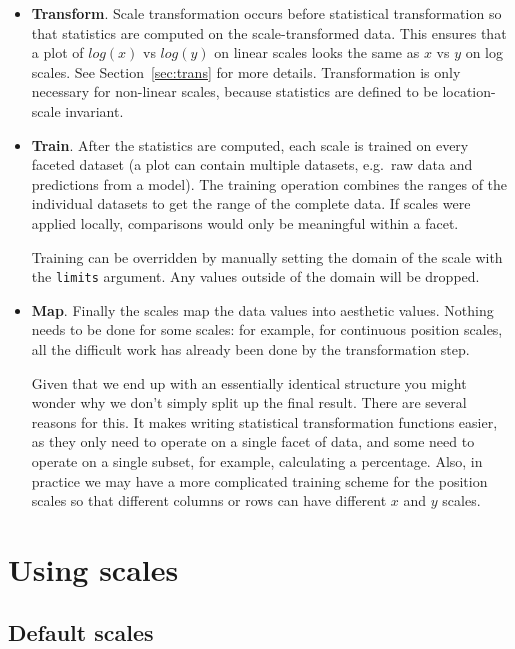 \begin{itemize}
	\item  {\bf Transform}. Scale transformation occurs before statistical transformation so that statistics are computed on the scale-transformed data.  This ensures that a plot of $log(x)$ vs $log(y)$ on linear scales looks the same as $x$ vs $y$ on log scales.  See Section~\ref{sec:trans} for more details. Transformation is only necessary for non-linear scales, because statistics are defined to be location-scale invariant.

	\item {\bf Train}. After the statistics are computed, each scale is trained on every faceted dataset (a plot can contain multiple datasets, e.g.\ raw data and predictions from a model).  The training operation combines the ranges of the individual datasets to get the range of the complete data.  If scales were applied locally, comparisons would only be meaningful within a facet.
	
	Training can be overridden by manually setting the domain of the scale with the {\tt limits} argument.  Any values outside of the domain will be dropped.

	\item {\bf Map}. Finally the scales map the data values into aesthetic values.  Nothing needs to be done for some scales: for example, for continuous position scales, all the difficult work has already been done by the transformation step.
	
	Given that we end up with an essentially identical structure you might wonder why we don't simply split up the final result.  There are several reasons for this.  It makes writing statistical transformation functions easier, as they only need to operate on a single facet of data, and some need to operate on a single subset, for example, calculating a percentage.  Also, in practice we may have a more complicated training scheme for the position scales so that different columns or rows can have different $x$ and $y$ scales.  
	
\end{itemize}

\section{Using scales}

\subsection{Default scales}
\label{sub:default_scales}

